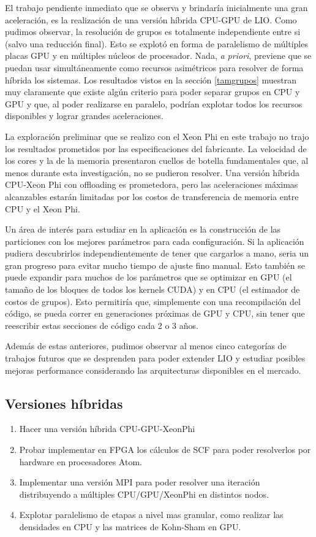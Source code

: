 El trabajo pendiente inmediato que se observa y brindar\'ia inicialmente una gran aceleraci\'on,
es la realizaci\'on de una versi\'on h\'ibrida CPU-GPU de LIO. Como pudimos observar, la resoluci\'on de grupos es
totalmente independiente entre si (salvo una reducci\'on final). Esto se explot\'o en forma de paralelismo
de m\'ultiples placas GPU y en m\'ultiples n\'ucleos de procesador. Nada, \textit{a priori}, previene
que se puedan usar simult\'aneamente como recursos asim\'etricos para resolver de forma h\'ibrida los sistemas.
Los resultados vistos en la secci\'on \ref{tamgrupos} muestran muy claramente que existe alg\'un criterio
para poder separar grupos en CPU y GPU y que, al poder realizarse en paralelo, podr\'ian explotar
todos los recursos disponibles y lograr grandes aceleraciones.

La exploraci\'on preliminar que se realizo con el Xeon Phi en este trabajo no trajo los resultados
prometidos por las especificaciones del fabricante. La velocidad de los cores y la de la memoria
presentaron cuellos de botella fundamentales que, al menos durante esta investigaci\'on, no se
pudieron resolver. Una versi\'on h\'ibrida CPU-Xeon Phi con offloading es prometedora, pero las aceleraciones m\'aximas
alcanzables estar\'an limitadas por los costos de transferencia de memoria entre CPU y el Xeon Phi.

Un \'area de inter\'es para estudiar en la aplicaci\'on es la construcci\'on de las particiones
con los mejores par\'ametros para cada configuraci\'on. Si la aplicaci\'on pudiera descubrirlos
independientemente de tener que cargarlos a mano, seria un gran progreso para evitar mucho
tiempo de ajuste fino manual. Esto tambi\'en se puede expandir para muchos de los par\'ametros
que se optimizar en GPU (el tama\~no de los bloques de todos los kernels CUDA) y en CPU (el estimador de costos
de grupos).
Esto permitir\'ia que, simplemente con una recompilaci\'on del c\'odigo, se pueda correr en generaciones
pr\'oximas de GPU y CPU, sin tener que reescribir estas secciones de c\'odigo cada 2 o 3 a\~nos.

Adem\'as de estas anteriores, pudimos observar al menos cinco categor\'ias de trabajos futuros que se
desprenden para poder extender LIO y estudiar posibles mejoras performance considerando
las arquitecturas disponibles en el mercado.
\subsection*{Versiones h\'ibridas}
\begin{enumerate}
 \item Hacer una versi\'on h\'ibrida CPU-GPU-XeonPhi
  \item Probar implementar en FPGA los c\'alculos de SCF para poder resolverlos por hardware en procesadores
    Atom.
  \item Implementar una versi\'on MPI para poder resolver una iteraci\'on distribuyendo
    a m\'ultiples CPU/GPU/XeonPhi en distintos nodos.
  \item Explotar paralelismo de etapas a nivel mas granular, como realizar las densidades en CPU y las matrices
    de Kohn-Sham en GPU.
\end{enumerate}


